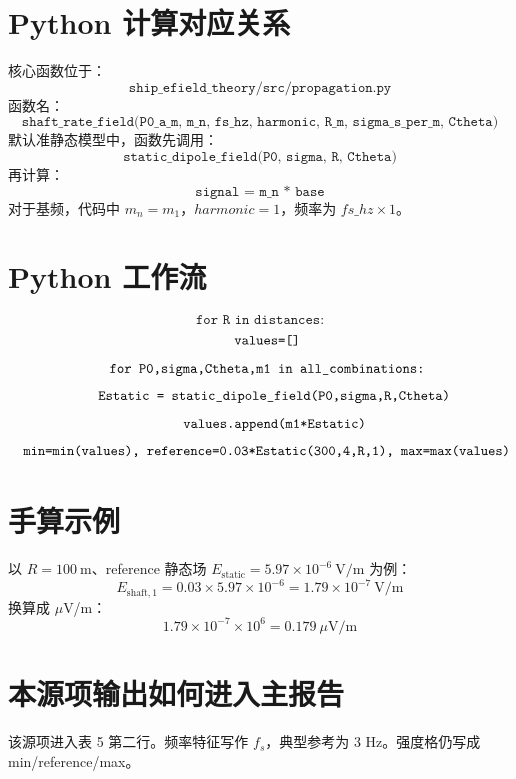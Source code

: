 \documentclass[UTF8,a4paper,11pt]{ctexart}
\begin{document}
\section{Python 计算对应关系}
核心函数位于：
\[
\texttt{ship\_efield\_theory/src/propagation.py}
\]
函数名：
\[
\texttt{shaft\_rate\_field(P0\_a\_m, m\_n, fs\_hz, harmonic, R\_m, sigma\_s\_per\_m, Ctheta)}
\]
默认准静态模型中，函数先调用：
\[
\texttt{static\_dipole\_field(P0, sigma, R, Ctheta)}
\]
再计算：
\[
\texttt{signal = m\_n * base}
\]
对于基频，代码中 $m_n=m_1$，$harmonic=1$，频率为 $fs\_hz\times1$。

\section{Python 工作流}
\[
\texttt{for R in distances:}
\]
\[
\texttt{\quad values=[]}
\]
\[
\texttt{\quad for P0,sigma,Ctheta,m1 in all\_combinations:}
\]
\[
\texttt{\quad\quad Estatic = static\_dipole\_field(P0,sigma,R,Ctheta)}
\]
\[
\texttt{\quad\quad values.append(m1*Estatic)}
\]
\[
\texttt{\quad min=min(values),\ reference=0.03*Estatic(300,4,R,1),\ max=max(values)}
\]

\section{手算示例}
以 $R=100\ \mathrm{m}$、reference 静态场 $E_{\mathrm{static}}=5.97\times10^{-6}\ \mathrm{V/m}$ 为例：
\[
E_{\mathrm{shaft},1}=0.03\times5.97\times10^{-6}
=1.79\times10^{-7}\ \mathrm{V/m}
\]
换算成 $\mu$V/m：
\[
1.79\times10^{-7}\times10^6=0.179\ \mu\mathrm{V/m}
\]

\section{本源项输出如何进入主报告}
该源项进入表 5 第二行。频率特征写作 $f_s$，典型参考为 3 Hz。强度格仍写成 min/reference/max。
\end{document}
